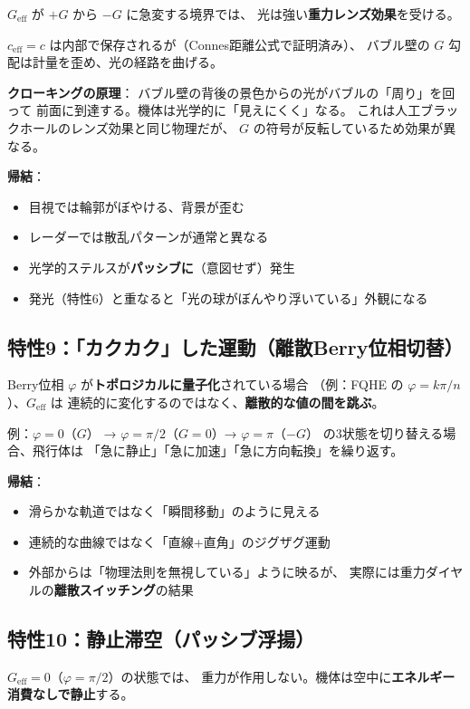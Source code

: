 \documentclass[11pt,a4paper]{article}
\begin{document}
$G_{\mathrm{eff}}$ が $+G$ から $-G$ に急変する境界では、
光は強い\textbf{重力レンズ効果}を受ける。

$c_{\mathrm{eff}} = c$ は内部で保存されるが（Connes距離公式で証明済み）、
バブル壁の $G$ 勾配は計量を歪め、光の経路を曲げる。

\textbf{クローキングの原理}：
バブル壁の背後の景色からの光がバブルの「周り」を回って
前面に到達する。機体は光学的に「見えにくく」なる。
これは人工ブラックホールのレンズ効果と同じ物理だが、
$G$ の符号が反転しているため効果が異なる。

\textbf{帰結}：
\begin{itemize}
\item 目視では輪郭がぼやける、背景が歪む
\item レーダーでは散乱パターンが通常と異なる
\item 光学的ステルスが\textbf{パッシブに}（意図せず）発生
\item 発光（特性6）と重なると「光の球がぼんやり浮いている」外観になる
\end{itemize}

\subsection{特性9：「カクカク」した運動（離散Berry位相切替）}

Berry位相 $\varphi$ が\textbf{トポロジカルに量子化}されている場合
（例：FQHE の $\varphi = k\pi/n$）、$G_{\mathrm{eff}}$ は
連続的に変化するのではなく、\textbf{離散的な値の間を跳ぶ}。

例：$\varphi = 0$（$G$） → $\varphi = \pi/2$（$G=0$）→ $\varphi = \pi$（$-G$）
の3状態を切り替える場合、飛行体は
「急に静止」「急に加速」「急に方向転換」を繰り返す。

\textbf{帰結}：
\begin{itemize}
\item 滑らかな軌道ではなく「瞬間移動」のように見える
\item 連続的な曲線ではなく「直線+直角」のジグザグ運動
\item 外部からは「物理法則を無視している」ように映るが、
  実際には重力ダイヤルの\textbf{離散スイッチング}の結果
\end{itemize}

\subsection{特性10：静止滞空（パッシブ浮揚）}

$G_{\mathrm{eff}} = 0$（$\varphi = \pi/2$）の状態では、
重力が作用しない。機体は空中に\textbf{エネルギー消費なしで静止}する。
\end{document}

